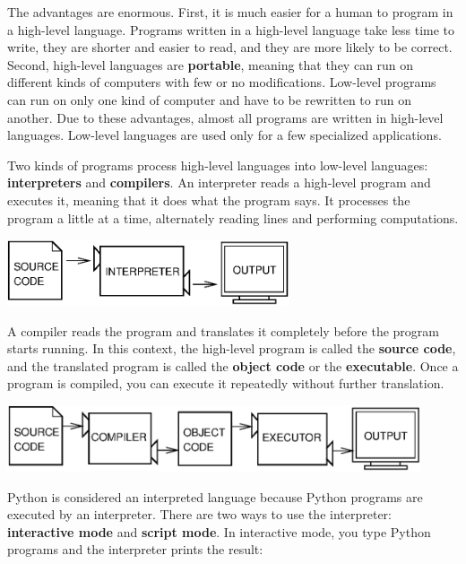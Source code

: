The advantages are enormous.  First, it is much easier for a human to program
in a high-level language.  Programs written in a high-level language
take less time to write, they are shorter and easier to read, and they
are more likely to be correct.  Second, high-level languages are {\bf
	portable}, meaning that they can run on different kinds of computers
with few or no modifications.  Low-level programs can run on only one
kind of computer and have to be rewritten to run on another.
Due to these advantages, almost all programs are written in high-level
languages.  Low-level languages are used only for a few specialized
applications.


Two kinds of programs process high-level languages
into low-level languages: {\bf interpreters} and {\bf compilers}.
An interpreter reads a high-level program and executes it, meaning that it
does what the program says.  It processes the program a little at a time,
alternately reading lines and performing computations.



\beforefig
\centerline{\includegraphics[height=0.77in]{figs/interpret.eps}}
\afterfig


A compiler reads the program and translates it completely before the
program starts running.  In this context, the high-level program is
called the {\bf source code}, and the translated program is called the
{\bf object code} or the {\bf executable}.  Once a program is
compiled, you can execute it repeatedly without further translation.

\beforefig
\centerline{\includegraphics[height=0.77in]{figs/compile.eps}}
\afterfig

Python is considered an interpreted language because Python programs
are executed by an interpreter.  There are two ways to use the
interpreter: {\bf interactive mode} and {\bf script mode}. In
interactive mode, you type Python programs and the interpreter prints
the result:

